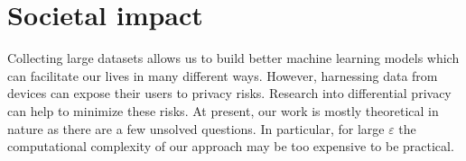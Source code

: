 \section{Societal impact}
\label{appendix:societal_impacts}

Collecting large datasets allows us to build better machine learning models which can facilitate our lives in many different ways. However, harnessing data from devices can expose their users to privacy risks. Research into differential privacy can help to minimize these risks. At present, our work is mostly theoretical in nature as there are a few unsolved questions. In particular, for large $\varepsilon$ the computational complexity of our approach may be too expensive to be practical.





